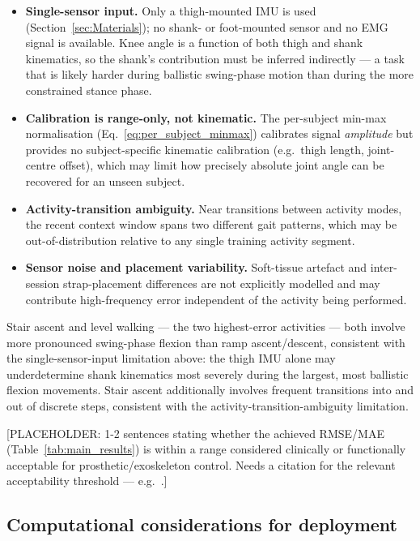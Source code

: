 \begin{itemize}
    \item \textbf{Single-sensor input.} Only a thigh-mounted IMU is used
    (Section~\ref{sec:Materials}); no shank- or foot-mounted sensor and no EMG
    signal is available. Knee angle is a function of both thigh and shank
    kinematics, so the shank's contribution must be inferred indirectly — a task
    that is likely harder during ballistic swing-phase motion than during the
    more constrained stance phase.
    \item \textbf{Calibration is range-only, not kinematic.} The per-subject
    min-max normalisation (Eq.~\ref{eq:per_subject_minmax}) calibrates signal
    \emph{amplitude} but provides no subject-specific kinematic calibration
    (e.g.\ thigh length, joint-centre offset), which may limit how precisely
    absolute joint angle can be recovered for an unseen subject.
    \item \textbf{Activity-transition ambiguity.} Near transitions between
    activity modes, the recent context window spans two different gait
    patterns, which may be out-of-distribution relative to any single training
    activity segment.
    \item \textbf{Sensor noise and placement variability.} Soft-tissue
    artefact and inter-session strap-placement differences are not explicitly
    modelled and may contribute high-frequency error independent of the
    activity being performed.
\end{itemize}

Stair ascent and level walking — the two highest-error activities — both
involve more pronounced swing-phase flexion than ramp ascent/descent,
consistent with the single-sensor-input limitation above: the thigh IMU alone
may underdetermine shank kinematics most severely during the largest, most
ballistic flexion movements. Stair ascent additionally involves frequent
transitions into and out of discrete steps, consistent with the
activity-transition-ambiguity limitation.

[PLACEHOLDER: 1-2 sentences stating whether the achieved RMSE/MAE
(Table~\ref{tab:main_results}) is within a range considered clinically or
functionally acceptable for prosthetic/exoskeleton control. Needs a citation for
the relevant acceptability threshold — e.g.\ \cite{PLACEHOLDER}.]

\subsection{Computational considerations for deployment}\label{sec:disc-compute}

